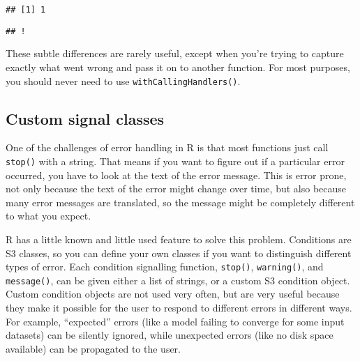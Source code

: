 \begin{itemize}
\begin{verbatim}
## [1] 1
\end{verbatim}

\begin{Shaded}
\begin{Highlighting}[]
\NormalTok{(}\NormalTok{(), } \NormalTok{)}
\end{Highlighting}
\end{Shaded}

\begin{verbatim}
## !
\end{verbatim}
\end{itemize}

These subtle differences are rarely useful, except when you're trying to
capture exactly what went wrong and pass it on to another function. For
most purposes, you should never need to use
\texttt{withCallingHandlers()}.

\hypertarget{custom-signal-classes}{%
\subsection{Custom signal classes}\label{custom-signal-classes}}

One of the challenges of error handling in R is that most functions just
call \texttt{stop()} with a string. That means if you want to figure out
if a particular error occurred, you have to look at the text of the
error message. This is error prone, not only because the text of the
error might change over time, but also because many error messages are
translated, so the message might be completely different to what you
expect. 

R has a little known and little used feature to solve this problem.
Conditions are S3 classes, so you can define your own classes if you
want to distinguish different types of error. Each condition signalling
function, \texttt{stop()}, \texttt{warning()}, and \texttt{message()},
can be given either a list of strings, or a custom S3 condition object.
Custom condition objects are not used very often, but are very useful
because they make it possible for the user to respond to different
errors in different ways. For example, ``expected'' errors (like a model
failing to converge for some input datasets) can be silently ignored,
while unexpected errors (like no disk space available) can be propagated
to the user.

